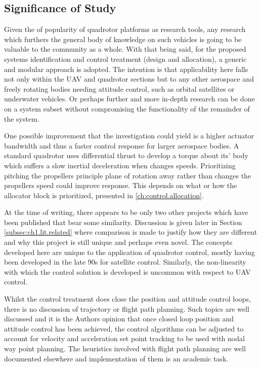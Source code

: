 \subsection{Significance of Study}
\label{subsec:intro.foreward.significance}
Given the of popularity of quadrotor platforms as research tools, any research which furthers the general body of knowledge on such vehicles is going to be valuable to the community as a whole. With that being said, for the proposed systems identification and control treatment (design and allocation), a generic and modular approach is adopted. The intention is that applicability here falls not only within the UAV and quadrotor sections but to any other aerospace and freely rotating bodies needing attitude control, such as orbital satellites or underwater vehicles. Or perhaps further and more in-depth research can be done on a system subset without compromising the functionality of the remainder of the system. 
\par
One possible improvement that the investigation could yield is a higher actuator bandwidth and thus a faster control response for larger aerospace bodies. A standard quadrotor uses differential thrust to develop a torque about its' body which suffers a slow inertial deceleration when changes speeds. Prioritizing pitching the propellers principle plane of rotation away rather than changes the propellers speed could improve response. This depends on what or how the allocator block is prioritized, presented in \ref{ch:control.allocation}.
\par
At the time of writing, there appears to be only two other projects which have been published that bear some similarity. Discussion is given later in Section \ref{subsec:ch1.lit.related} where comparison is made to justify how they are different and why this project is still unique and perhaps even novel. The concepts developed here are unique to the application of quadrotor control, mostly having been developed in the late 90s for satellite control. Similarly, the non-linearity with which the control solution is developed is uncommon with respect to UAV control.
\par
Whilst the control treatment does close the position  and attitude control loops, there is no discussion of trajectory or flight path planning. Such topics are well discussed and it is the Authors opinion that once closed loop position and attitude control has been achieved, the control algorithms can be adjusted to account for velocity and acceleration set point tracking to be used with nodal way point planning. The heuristics involved with flight path planning are well documented elsewhere and implementation of them is an academic task.
\par
